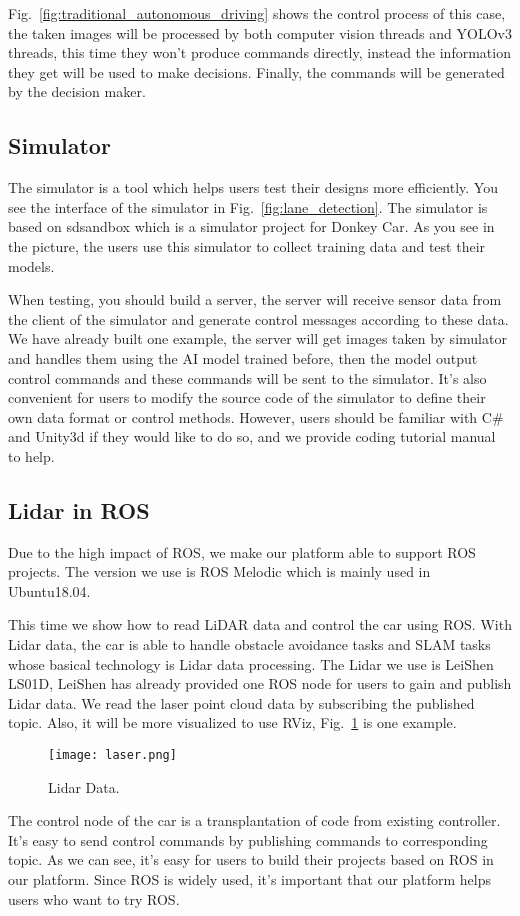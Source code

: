 Fig.~\ref{fig:traditional_autonomous_driving} shows the control process of this case, the taken images will be processed by both computer vision threads and YOLOv3 threads, this time they won't produce commands directly, instead the information they get will be used to make decisions. Finally, the commands will be generated by the decision maker.

\subsection{Simulator}
The simulator is a tool which helps users test their designs more efficiently. You see the interface of the simulator in Fig.~\ref{fig:lane_detection}. The simulator is based on sdsandbox\cite{sdsandbox} which is a simulator project for Donkey Car\cite{donkeycar}. As you see in the picture, the users use this simulator to collect training data and test their models. 

When testing, you should build a server, the server will receive sensor data from the client of the simulator and generate control messages according to these data. We have already built one example, the server will get images taken by simulator and handles them using the AI model trained before, then the model output control commands and these commands will be sent to the simulator.
It's also convenient for users to modify the source code of the simulator to define their own data format or control methods. However, users should be familiar with C\# and Unity3d if they would like to do so, and we provide coding tutorial manual to help.

\subsection{Lidar in ROS}
Due to the high impact of ROS, we make our platform able to support ROS projects. The version we use is ROS Melodic\cite{rosmelodic} which is mainly used in Ubuntu18.04. 

This time we show how to read LiDAR data and control the car using ROS. With Lidar data, the car is able to handle obstacle avoidance tasks and SLAM tasks whose basical technology is Lidar data processing.
The Lidar we use is LeiShen LS01D\cite{leishen}, LeiShen has already provided one ROS node for users to gain and publish Lidar data. We read the  laser point cloud data by subscribing the published topic. Also, it will be more visualized to use RViz\cite{rviz}, Fig.~\ref{ld} is one example.

\begin{figure}[b]
\centerline{\texttt{[image: laser.png]}}
\caption{Lidar Data.}
\label{ld}
\end{figure}

The control node of the car is a transplantation of code from existing controller. It's easy to send control commands by publishing commands to corresponding topic. As we can see, it's easy for users to build their projects based on ROS in our platform. Since ROS is widely used, it's important that our platform helps users who want to try ROS.